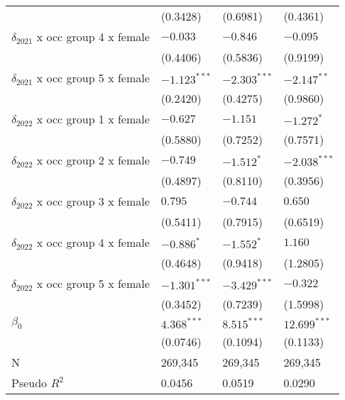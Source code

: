 \begin{tabular}{llll}
                                       &           (0.3428) &           (0.6981) &           (0.4361) \\
$\delta_{2021}$ x occ group 4 x female &           $-0.033$ &           $-0.846$ &           $-0.095$ \\
                                       &           (0.4406) &           (0.5836) &           (0.9199) \\
$\delta_{2021}$ x occ group 5 x female &     $-1.123^{***}$ &     $-2.303^{***}$ &      $-2.147^{**}$ \\
                                       &           (0.2420) &           (0.4275) &           (0.9860) \\
$\delta_{2022}$ x occ group 1 x female &           $-0.627$ &           $-1.151$ &         $-1.272^*$ \\
                                       &           (0.5880) &           (0.7252) &           (0.7571) \\
$\delta_{2022}$ x occ group 2 x female &           $-0.749$ &         $-1.512^*$ &     $-2.038^{***}$ \\
                                       &           (0.4897) &           (0.8110) &           (0.3956) \\
$\delta_{2022}$ x occ group 3 x female &            $0.795$ &           $-0.744$ &            $0.650$ \\
                                       &           (0.5411) &           (0.7915) &           (0.6519) \\
$\delta_{2022}$ x occ group 4 x female &         $-0.886^*$ &         $-1.552^*$ &            $1.160$ \\
                                       &           (0.4648) &           (0.9418) &           (1.2805) \\
$\delta_{2022}$ x occ group 5 x female &     $-1.301^{***}$ &     $-3.429^{***}$ &           $-0.322$ \\
                                       &           (0.3452) &           (0.7239) &           (1.5998) \\
$\beta_0$                              &      $4.368^{***}$ &      $8.515^{***}$ &     $12.699^{***}$ \\
                                       &           (0.0746) &           (0.1094) &           (0.1133) \\
N                                      &            269,345 &            269,345 &            269,345 \\
Pseudo $R^2$                           &             0.0456 &             0.0519 &             0.0290 \\
\bottomrule
\end{tabular}
